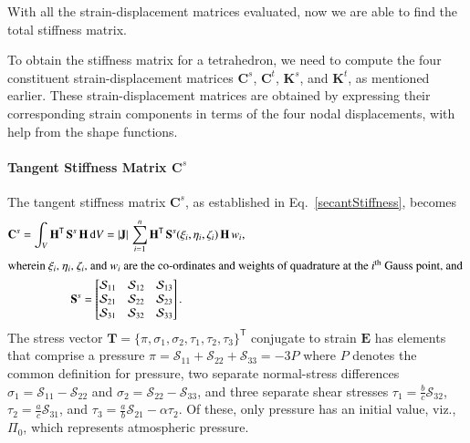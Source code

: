 With all the strain-displacement matrices evaluated, now we are able to find the total stiffness matrix.


To obtain the stiffness matrix for a tetrahedron, we need to compute the four constituent strain-displacement matrices $\mathbf{C}^s$, $\mathbf{C}^t$, $\mathbf{K}^s$, and $\mathbf{K}^t$, as mentioned earlier. These strain-displacement matrices are obtained by expressing their corresponding strain components in terms of the four nodal displacements, with help from the shape functions.

\paragraph{Tangent Stiffness Matrix $\mathbf{C}^s$}

The tangent stiffness matrix $\mathbf{C}^s$, as established in Eq.~\ref{secantStiffness}, becomes 
\begin{subequations}
	\begin{gather}
		\mathbf{C}^s = \int_{V} \mathbf{H}^{\mathsf{T}} \,  \mathbf{S}^s \, \mathbf{H} \, \mathrm{d} V
		=  | \mathbf{J} |  \, \sum_{i=1}^{n}  \mathbf{H}^{\mathsf{T}} \, \mathbf{S}^s (\xi_i , \eta_i, \zeta_i) \, \mathbf{H} \, w_i , \\
        \intertext{wherein $\xi_i$, $\eta_i$, $\zeta_i$, and $w_i$ are the co-ordinates and weights of quadrature at the $i^{\mathrm{th}}$ Gauss point, and 
        }
        \mathbf{S}^s = \begin{bmatrix}
        	\mathcal{S}_{11} & \mathcal{S}_{12} & \mathcal{S}_{13} \\
        	\mathcal{S}_{21} & \mathcal{S}_{22} & \mathcal{S}_{23} \\
        	\mathcal{S}_{31} & \mathcal{S}_{32} & \mathcal{S}_{33}
        	\end{bmatrix} .
        \label{stressmtx3D}
	\end{gather}
\end{subequations}
The stress vector $\boldsymbol{T} = \{ \pi, \sigma_1, \sigma_2, \tau_1, \tau_2, \tau_3 \}^{\mathsf{T}}$ conjugate to strain $\boldsymbol{E}$ has elements that comprise a pressure $\pi = \mathcal{S}_{11} + \mathcal{S}_{22} + \mathcal{S}_{33} = -3P$ where $P$ denotes the common definition for pressure, two separate normal-stress differences $\sigma_1 = \mathcal{S}_{11} - \mathcal{S}_{22}$ and $\sigma_2 = \mathcal{S}_{22} - \mathcal{S}_{33}$, and three separate shear stresses $\tau_1 = \frac{b}{c} \mathcal{S}_{32}$, $\tau_2 = \frac{a}{c} \mathcal{S}_{31}$, and $\tau_3 = \frac{a}{b} \mathcal{S}_{21} - \alpha \tau_2$.  Of these, only pressure has an initial value, viz., $\Pi_0$, which represents atmospheric pressure. 
